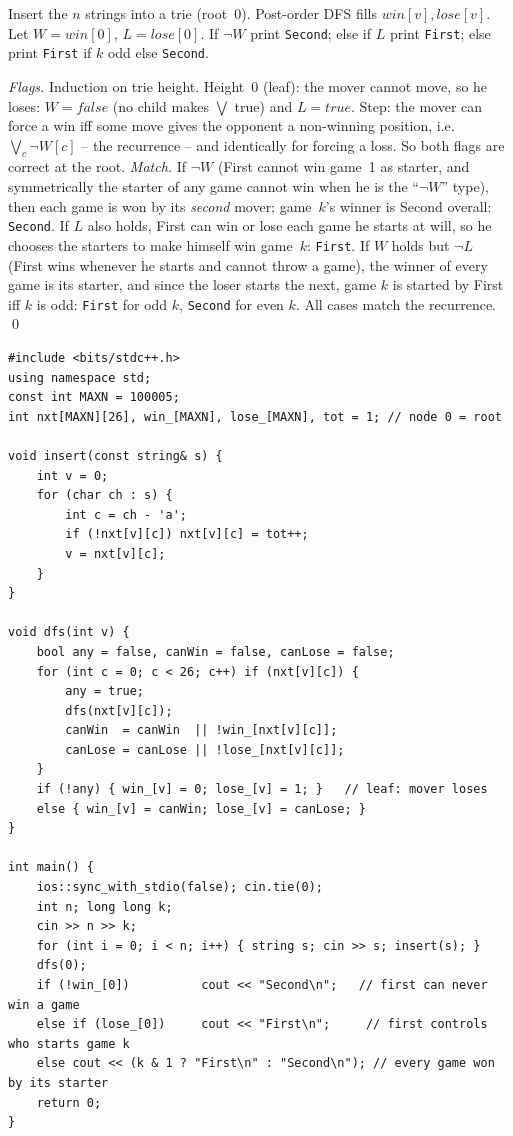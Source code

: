 Insert the $n$ strings into a trie (root~$0$). Post-order DFS fills
$\mathit{win}[v], \mathit{lose}[v]$. Let $W = \mathit{win}[0]$, $L = \mathit{lose}[0]$.
If $\neg W$ print \texttt{Second}; else if $L$ print \texttt{First}; else print
\texttt{First} if $k$ odd else \texttt{Second}.

\begin{proofbox}
\emph{Flags.} Induction on trie height. Height~$0$ (leaf): the mover cannot move, so he
loses: $W=\mathit{false}$ (no child makes $\bigvee$ true) and $L=\mathit{true}$. Step: the
mover can force a win iff some move gives the opponent a non-winning position, i.e.\
$\bigvee_c \neg W[c]$ -- the recurrence -- and identically for forcing a loss. So both flags
are correct at the root. \emph{Match.} If $\neg W$ (First cannot win game~1 as starter, and
symmetrically the starter of any game cannot win when he is the ``$\neg W$'' type), then
each game is won by its \emph{second} mover; game~$k$'s winner is Second overall:
\texttt{Second}. If $L$ also holds, First can win or lose each game he starts at will, so he
chooses the starters to make himself win game~$k$: \texttt{First}. If $W$ holds but $\neg L$
(First wins whenever he starts and cannot throw a game), the winner of every game is its
starter, and since the loser starts the next, game $k$ is started by First iff $k$ is odd:
\texttt{First} for odd $k$, \texttt{Second} for even $k$. All cases match the recurrence.
\qed
\end{proofbox}

\begin{lstlisting}[caption={Codeforces 455B -- two-flag win/lose DP on the trie plus the k-round verdict (\coderef{c27-grundy} is the Grundy cousin we deliberately avoid)}, label={lst:c27-455b-soln}]
#include <bits/stdc++.h>
using namespace std;
const int MAXN = 100005;
int nxt[MAXN][26], win_[MAXN], lose_[MAXN], tot = 1; // node 0 = root

void insert(const string& s) {
    int v = 0;
    for (char ch : s) {
        int c = ch - 'a';
        if (!nxt[v][c]) nxt[v][c] = tot++;
        v = nxt[v][c];
    }
}

void dfs(int v) {
    bool any = false, canWin = false, canLose = false;
    for (int c = 0; c < 26; c++) if (nxt[v][c]) {
        any = true;
        dfs(nxt[v][c]);
        canWin  = canWin  || !win_[nxt[v][c]];
        canLose = canLose || !lose_[nxt[v][c]];
    }
    if (!any) { win_[v] = 0; lose_[v] = 1; }   // leaf: mover loses
    else { win_[v] = canWin; lose_[v] = canLose; }
}

int main() {
    ios::sync_with_stdio(false); cin.tie(0);
    int n; long long k;
    cin >> n >> k;
    for (int i = 0; i < n; i++) { string s; cin >> s; insert(s); }
    dfs(0);
    if (!win_[0])          cout << "Second\n";   // first can never win a game
    else if (lose_[0])     cout << "First\n";     // first controls who starts game k
    else cout << (k & 1 ? "First\n" : "Second\n"); // every game won by its starter
    return 0;
}
\end{lstlisting}

